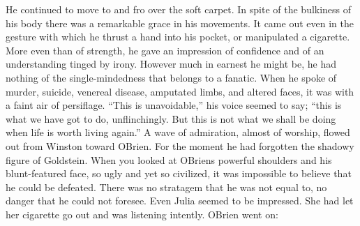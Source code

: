 He continued to move to and fro over the soft carpet. In spite of the
bulkiness of his body there was a remarkable grace in his movements. It
came out even in the gesture with which he thrust a hand into his
pocket, or manipulated a cigarette. More even than of strength, he gave
an impression of confidence and of an understanding tinged by irony.
However much in earnest he might be, he had nothing of the
single-mindedness that belongs to a fanatic. When he spoke of murder,
suicide, venereal disease, amputated limbs, and altered faces, it was
with a faint air of persiflage. ``This is unavoidable,'' his voice seemed
to say; ``this is what we have got to do, unflinchingly. But this is not
what we shall be doing when life is worth living again.'' A wave of
admiration, almost of worship, flowed out from Winston toward
O\textquotesingle Brien. For the moment he had forgotten the shadowy
figure of Goldstein. When you looked at
O\textquotesingle Brien\textquotesingle s powerful shoulders and his
blunt-featured face, so ugly and yet so civilized, it was impossible to
believe that he could be defeated. There was no stratagem that he was
not equal to, no danger that he could not foresee. Even Julia seemed to
be impressed. She had let her cigarette go out and was listening
intently. O\textquotesingle Brien went on:

